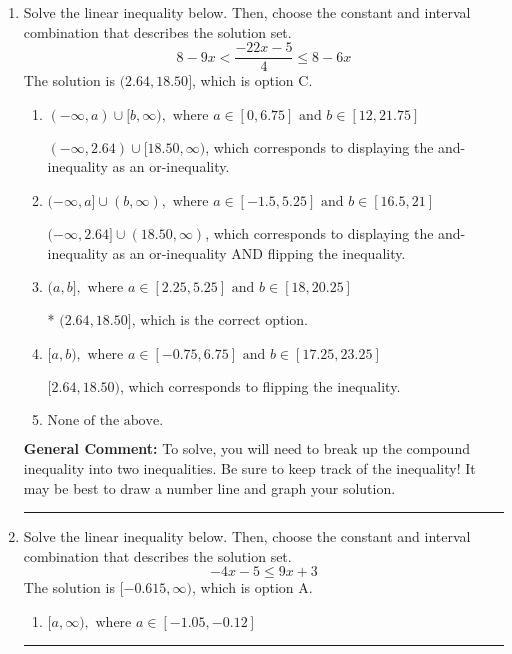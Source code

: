 \documentclass{extbook}[14pt]
\newcommand{\litem}[1]{\item #1

\rule{\textwidth}{0.4pt}}
\begin{document}
\begin{enumerate}
{\begin{enumerate}[label=\Alph*.]
This describes the values more than 6 from 4
\item \( (-\infty, -2] \cup [10, \infty) \)

This describes the values no less than 6 from 4
\item \( [-2, 10] \)

This describes the values no more than 6 from 4
\item \( \text{None of the above} \)

You likely thought the values in the interval were not correct.
\end{enumerate}

\textbf{General Comment:} When thinking about this language, it helps to draw a number line and try points.
}
\litem{
Solve the linear inequality below. Then, choose the constant and interval combination that describes the solution set.
\[ 8 - 9 x < \frac{-22 x - 5}{4} \leq 8 - 6 x \]The solution is \( (2.64, 18.50] \), which is option C.\begin{enumerate}[label=\Alph*.]
\item \( (-\infty, a) \cup [b, \infty), \text{ where } a \in [0, 6.75] \text{ and } b \in [12, 21.75] \)

$(-\infty, 2.64) \cup [18.50, \infty)$, which corresponds to displaying the and-inequality as an or-inequality.
\item \( (-\infty, a] \cup (b, \infty), \text{ where } a \in [-1.5, 5.25] \text{ and } b \in [16.5, 21] \)

$(-\infty, 2.64] \cup (18.50, \infty)$, which corresponds to displaying the and-inequality as an or-inequality AND flipping the inequality.
\item \( (a, b], \text{ where } a \in [2.25, 5.25] \text{ and } b \in [18, 20.25] \)

* $(2.64, 18.50]$, which is the correct option.
\item \( [a, b), \text{ where } a \in [-0.75, 6.75] \text{ and } b \in [17.25, 23.25] \)

$[2.64, 18.50)$, which corresponds to flipping the inequality.
\item \( \text{None of the above.} \)


\end{enumerate}

\textbf{General Comment:} To solve, you will need to break up the compound inequality into two inequalities. Be sure to keep track of the inequality! It may be best to draw a number line and graph your solution.
}
\litem{
Solve the linear inequality below. Then, choose the constant and interval combination that describes the solution set.
\[ -4x -5 \leq 9x + 3 \]The solution is \( [-0.615, \infty) \), which is option A.\begin{enumerate}[label=\Alph*.]
\item \( [a, \infty), \text{ where } a \in [-1.05, -0.12] \)


\end{enumerate}}
\end{enumerate}
\end{document}

